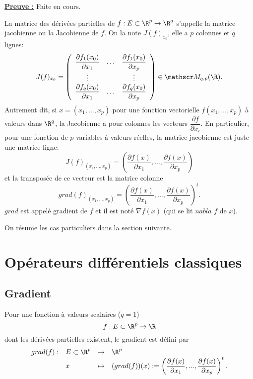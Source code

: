 \documentclass[class=report,crop=false]{standalone}
\begin{document}
\noindent \underline{\bf Preuve :}
Faite en cours.



\begin{definition}
\textcolor[rgb]{0.73,0.00,0.00}{
La matrice des dérivées partielles de $f: E \subset \R^p \rightarrow \R^q$ s'appelle 
la matrice jacobienne ou la Jacobienne de $f$. On la note $J(f)_{x_0}$, elle a $p$ 
colonnes et $q$ lignes:
\begin{equation*}
 J(f)_{x_0}=\left(
          \begin{array}{ccc}
            \dfrac{\partial f_1(x_0)}{\partial x_1} & \ldots &  \dfrac{\partial f_1(x_0)}{\partial x_p}  \\
            \vdots &  & \vdots \\
           \dfrac{\partial f_q(x_0)}{\partial x_1}  & \ldots & \dfrac{\partial f_q(x_0)}{\partial x_p} \\
          \end{array}
        \right)\in \mat_{q,p}(\R).
\end{equation*}
Autrement dit, si $x=(x_1,...,x_p)$ pour une fonction vectorielle $f(x_1,...,x_p)$  à valeurs dans $\R^q$, la Jacobienne
a pour colonnes les vecteurs $\dfrac{\partial f}{\partial x_i}$. En particulier, pour une fonction de 
$p$ variables à valeurs réelles, la matrice jacobienne est juste une matrice ligne:
\begin{equation*}
J(f)_{(x_1,...,x_p)}=\left(\dfrac{\partial f(x)}{\partial x_1},...,\dfrac{\partial f(x)}{\partial x_p}\right)
\end{equation*}
et la transposée de ce vecteur est la matrice colonne
\begin{equation*}
grad(f)_{(x_1,...,x_p)}=\left(\dfrac{\partial f(x)}{\partial x_1},...,\dfrac{\partial f(x)}{\partial x_p}\right)^t.
\end{equation*}
$grad$ est appelé gradient de $f$ et il est noté $\nabla f(x)$ (qui se lit $nabla$ $f$ de $x$).
}
 \end{definition}

\noindent On résume les cas particuliers dans la section suivante.

\section{Opérateurs différentiels classiques}
\subsection{Gradient}
\noindent Pour une fonction \`a valeurs scalaires ($q=1$)
\begin{equation*}
  f :E \subset \R^p \rightarrow \R
\end{equation*}
dont les dérivées partielles existent, le gradient
est d\'efini par
\begin{equation*}
\begin{array}{clll}
    grad (f) :& E \subset \R^p & \rightarrow & \R^p \\
     & x & \mapsto & (grad (f))(x):=\left(\dfrac{\partial f(x)}{\partial x_1},...,\dfrac{\partial f(x)}{\partial x_p}\right)^t.
\end{array}
  \end{equation*}
\end{document}

